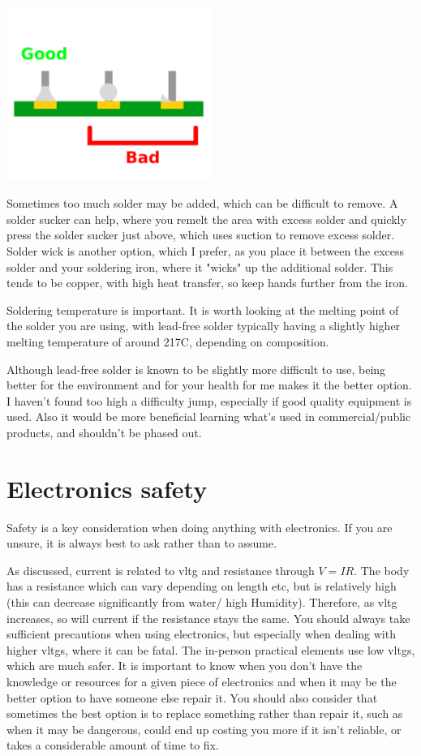\documentclass[a4paper,11pt]{report}
\begin{document}
\includegraphics[width=0.5\textwidth]{solderjoints}

Sometimes too much solder may be added, which can be difficult to remove. A solder sucker can help, where you remelt the area with excess solder and quickly press the solder sucker just above, which uses suction to remove excess solder. Solder wick is another option, which I prefer, as you place it between the excess solder and your soldering iron, where it "wicks" up the additional solder. This tends to be copper, with high heat transfer, so keep hands further from the iron.

Soldering temperature is important. It is worth looking at the melting point of the solder you are using, with lead-free solder typically having a slightly higher melting temperature of around 217C, depending on composition.

Although lead-free solder is known to be slightly more difficult to use, being better for the environment and for your health for me makes it the better option. I haven't found too high a difficulty jump, especially if good quality equipment is used. Also it would be more beneficial learning what's used in commercial/public products, and shouldn't be phased out.

\section{Electronics safety}

Safety is a key consideration when doing anything with electronics. If you are unsure, it is always best to ask rather than to assume.

As discussed, current is related to \gls{vltg} and resistance through $V=IR$. The body has a resistance which can vary depending on length etc, but is relatively high (this can decrease significantly from water/ high Humidity). Therefore, as \gls{vltg} increases, so will current if the resistance stays the same. You should always take sufficient precautions when using electronics, but especially when dealing with higher \gls{vltg}s, where it can be fatal. The in-person practical elements use low \gls{vltg}s, which are much safer. It is important to know when you don't have the knowledge or resources for a given piece of electronics and when it may be the better option to have someone else repair it. You should also consider that sometimes the best option is to replace something rather than repair it, such as when it may be dangerous, could end up costing you more if it isn't reliable, or takes a considerable amount of time to fix.
\end{document}
